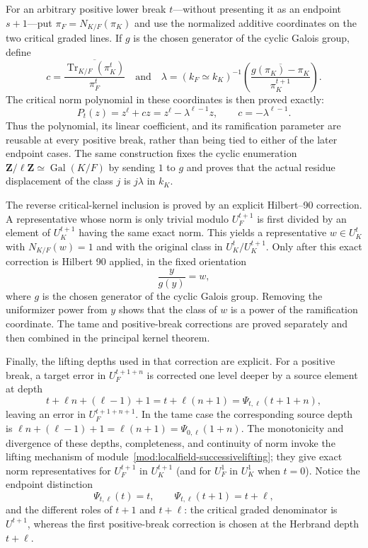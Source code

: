 \begin{theorem}
For an arbitrary positive lower break $t$---without presenting it as an
endpoint $s+1$---put $\pi_F=N_{K/F}(\pi_K)$ and use the normalized additive
coordinates on the two critical graded lines.  If $g$ is the chosen generator
of the cyclic Galois group, define
\[
 c=\overline{\frac{\operatorname{Tr}_{K/F}(\pi_K^t)}{\pi_F^t}}
 \quad\text{and}\quad
 \lambda=(k_F\simeq k_K)^{-1}
   \left(\overline{\frac{g(\pi_K)-\pi_K}{\pi_K^{t+1}}}\right).
\]
The critical norm polynomial in these coordinates is then proved exactly:
\[
 P_t(z)=z^\ell+c z
       =z^\ell-\lambda^{\ell-1}z,
 \qquad c=-\lambda^{\ell-1}.
\]
Thus the polynomial, its linear coefficient, and its ramification parameter
are reusable at every positive break, rather than being tied to either of the
later endpoint cases.  The same construction fixes the cyclic enumeration
$\mathbf Z/\ell\mathbf Z\simeq\operatorname{Gal}(K/F)$ by sending $1$ to
$g$ and proves that the actual residue displacement of the class $j$ is
$j\lambda$ in $k_K$.

The reverse critical-kernel inclusion is proved by an explicit
Hilbert--90 correction.  A representative whose norm is only trivial
modulo $U_F^{t+1}$ is first divided by an element of $U_K^{t+1}$ having
the same exact norm.  This yields a representative $w\in U_K^t$ with
$N_{K/F}(w)=1$ and with the original class in
$U_K^t/U_K^{t+1}$.  Only after this exact correction is Hilbert 90 applied,
in the fixed orientation
\[
 \frac{y}{g(y)}=w,
\]
where $g$ is the chosen generator of the cyclic Galois group.  Removing the
uniformizer power from $y$ shows that the class of $w$ is a power of the
ramification coordinate.  The tame and positive-break corrections are
proved separately and then combined in the principal kernel theorem.

Finally, the lifting depths used in that correction are explicit.  For a
positive break, a target error in $U_F^{t+1+n}$ is corrected one level
deeper by a source element at depth
\[
 t+\ell n+(\ell-1)+1=t+\ell(n+1)
   =\Psi_{t,\ell}(t+1+n),
\]
leaving an error in $U_F^{t+1+n+1}$.  In the tame case the corresponding
source depth is
$\ell n+(\ell-1)+1=\ell(n+1)=\Psi_{0,\ell}(1+n)$.
The monotonicity and divergence of these depths, completeness, and
continuity of norm invoke the lifting mechanism of
module~\ref{mod:localfield-successivelifting}; they give exact norm
representatives for $U_F^{t+1}$ in $U_K^{t+1}$ (and for $U_F^1$ in
$U_K^1$ when $t=0$).  Notice the endpoint distinction
\[
 \Psi_{t,\ell}(t)=t,
 \qquad
 \Psi_{t,\ell}(t+1)=t+\ell,
\]
and the different roles of $t+1$ and $t+\ell$: the critical graded
denominator is $U^{t+1}$, whereas the first positive-break correction is
chosen at the Herbrand depth $t+\ell$.


\end{theorem}
